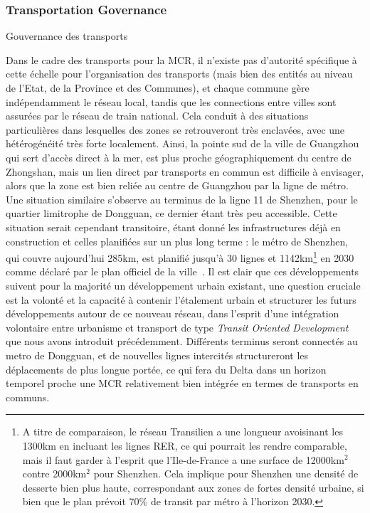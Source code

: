 \subsubsection{Transportation Governance}{Gouvernance des transports}

\bpar{}
{
 Dans le cadre des transports pour la MCR, il n'existe pas d'autorité spécifique à cette échelle pour l'organisation des transports (mais bien des entités au niveau de l'Etat, de la Province et des Communes), et chaque commune gère indépendamment le réseau local, tandis que les connections entre villes sont assurées par le réseau de train national. Cela conduit à des situations particulières dans lesquelles des zones se retrouveront très enclavées, avec une hétérogénéité très forte localement. Ainsi, la pointe sud de la ville de Guangzhou qui sert d'accès direct à la mer, est plus proche géographiquement du centre de Zhongshan, mais un lien direct par transports en commun est difficile à envisager, alors que la zone est bien reliée au centre de Guangzhou par la ligne de métro. Une situation similaire s'observe au terminus de la ligne 11 de Shenzhen, pour le quartier limitrophe de Dongguan, ce dernier étant très peu accessible. Cette situation serait cependant transitoire, étant donné les infrastructures déjà en construction et celles planifiées sur un plus long terme : le métro de Shenzhen, qui couvre aujourd'hui 285km, est planifié jusqu'à 30 lignes et 1142km\footnote{A titre de comparaison, le réseau Transilien a une longueur avoisinant les 1300km en incluant les lignes RER, ce qui pourrait les rendre comparable, mais il faut garder à l'esprit que l'Ile-de-France a une surface de 12000km$^2$ contre 2000km$^2$ pour Shenzhen. Cela implique pour Shenzhen une densité de desserte bien plus haute, correspondant aux zones de fortes densité urbaine, si bien que le plan prévoit 70\% de transit par métro à l'horizon 2030.} en 2030 comme déclaré par le plan officiel de la ville~\cite{shenzhen2016plan}. Il est clair que ces développements suivent pour la majorité un développement urbain existant, une question cruciale est la volonté et la capacité à contenir l'étalement urbain et structurer les futurs développements autour de ce nouveau réseau, dans l'esprit d'une intégration volontaire entre urbanisme et transport de type \emph{Transit Oriented Development} que nous avons introduit précédemment. Différents terminus seront connectés au metro de Dongguan, et de nouvelles lignes intercités structureront les déplacements de plus longue portée, ce qui fera du Delta dans un horizon temporel proche une MCR relativement bien intégrée en termes de transports en communs.
}



